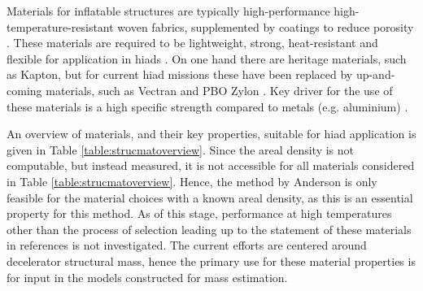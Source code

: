 Materials for inflatable structures are typically high-performance high-temperature-resistant woven fabrics, supplemented by coatings to reduce porosity \cite{Jenkins2001}. These materials are required to be lightweight, strong, heat-resistant and flexible for application in \glspl{hiad} \cite{Samareh2011}. On one hand there are heritage materials, such as Kapton, but for current \gls{hiad} missions these have been replaced by up-and-coming materials, such as Vectran and PBO Zylon \cite{Dillman2012,  Smith2010}. Key driver for the use of these materials is a high specific strength compared to metals (e.g. aluminium) \cite{Samareh2011}. 

An overview of materials, and their key properties, suitable for \gls{hiad} application is given in Table \ref{table:strucmatoverview}. Since the areal density is not computable, but instead measured, it is not accessible for all materials considered in Table \ref{table:strucmatoverview}. Hence, the method by Anderson \cite{Anderson1969} is only feasible for the material choices with a known areal density, as this is an essential property for this method. As of this stage, performance at high temperatures other than the process of selection leading up to the statement of these materials in references \cite{Dillman2012, Smith2010} is not investigated. The current efforts are centered around decelerator structural mass, hence the primary use for these material properties is for input in the models constructed for mass estimation.

